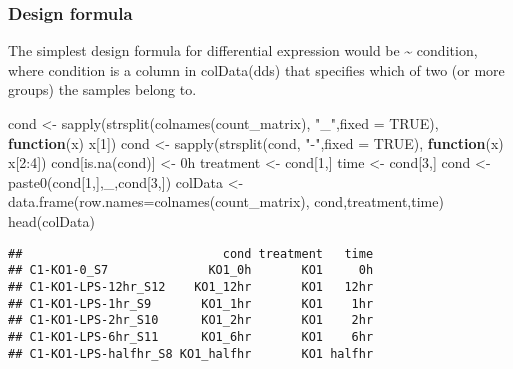 \documentclass[
]{article}
\newenvironment{Shaded}{\begin{snugshade}}{\end{snugshade}}
\newcommand{\AttributeTok}[1]{\textcolor[rgb]{0.77,0.63,0.00}{#1}}
\newcommand{\ConstantTok}[1]{\textcolor[rgb]{0.00,0.00,0.00}{#1}}
\newcommand{\ControlFlowTok}[1]{\textcolor[rgb]{0.13,0.29,0.53}{\textbf{#1}}}
\newcommand{\DecValTok}[1]{\textcolor[rgb]{0.00,0.00,0.81}{#1}}
\newcommand{\FunctionTok}[1]{\textcolor[rgb]{0.00,0.00,0.00}{#1}}
\newcommand{\NormalTok}[1]{#1}
\newcommand{\OtherTok}[1]{\textcolor[rgb]{0.56,0.35,0.01}{#1}}
\newcommand{\SpecialCharTok}[1]{\textcolor[rgb]{0.00,0.00,0.00}{#1}}
\newcommand{\StringTok}[1]{\textcolor[rgb]{0.31,0.60,0.02}{#1}}
\begin{document}
\hypertarget{design-formula}{%
\subsubsection{Design formula}\label{design-formula}}

The simplest design formula for differential expression would be
\textasciitilde{} condition, where condition is a column in colData(dds)
that specifies which of two (or more groups) the samples belong to.

\begin{Shaded}
\begin{Highlighting}[]
\NormalTok{cond }\OtherTok{\textless{}{-}} \FunctionTok{sapply}\NormalTok{(}\FunctionTok{strsplit}\NormalTok{(}\FunctionTok{colnames}\NormalTok{(count\_matrix), }\StringTok{"\_"}\NormalTok{,}\AttributeTok{fixed =} \ConstantTok{TRUE}\NormalTok{), }\ControlFlowTok{function}\NormalTok{(x) x[}\DecValTok{1}\NormalTok{])}
\NormalTok{cond }\OtherTok{\textless{}{-}} \FunctionTok{sapply}\NormalTok{(}\FunctionTok{strsplit}\NormalTok{(cond, }\StringTok{"{-}"}\NormalTok{,}\AttributeTok{fixed =} \ConstantTok{TRUE}\NormalTok{), }\ControlFlowTok{function}\NormalTok{(x) x[}\DecValTok{2}\SpecialCharTok{:}\DecValTok{4}\NormalTok{])}
\NormalTok{cond[}\FunctionTok{is.na}\NormalTok{(cond)] }\OtherTok{\textless{}{-}} \StringTok{\textquotesingle{}0h\textquotesingle{}}
\NormalTok{treatment }\OtherTok{\textless{}{-}}\NormalTok{ cond[}\DecValTok{1}\NormalTok{,]}
\NormalTok{time }\OtherTok{\textless{}{-}}\NormalTok{ cond[}\DecValTok{3}\NormalTok{,]}
\NormalTok{cond }\OtherTok{\textless{}{-}} \FunctionTok{paste0}\NormalTok{(cond[}\DecValTok{1}\NormalTok{,],}\StringTok{\textquotesingle{}\_\textquotesingle{}}\NormalTok{,cond[}\DecValTok{3}\NormalTok{,])}
\NormalTok{colData }\OtherTok{\textless{}{-}} \FunctionTok{data.frame}\NormalTok{(}\AttributeTok{row.names=}\FunctionTok{colnames}\NormalTok{(count\_matrix), cond,treatment,time)}
\FunctionTok{head}\NormalTok{(colData)}
\end{Highlighting}
\end{Shaded}

\begin{verbatim}
##                            cond treatment   time
## C1-KO1-0_S7              KO1_0h       KO1     0h
## C1-KO1-LPS-12hr_S12    KO1_12hr       KO1   12hr
## C1-KO1-LPS-1hr_S9       KO1_1hr       KO1    1hr
## C1-KO1-LPS-2hr_S10      KO1_2hr       KO1    2hr
## C1-KO1-LPS-6hr_S11      KO1_6hr       KO1    6hr
## C1-KO1-LPS-halfhr_S8 KO1_halfhr       KO1 halfhr
\end{verbatim}
\end{document}
